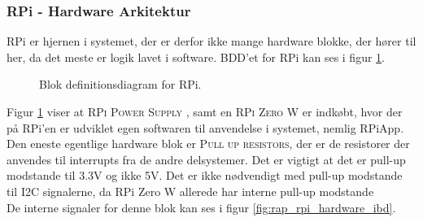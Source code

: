 \documentclass[Rapport/Rapport_main.tex]{subfiles}
\begin{document}
\subsubsection{RPi - Hardware Arkitektur}
RPi er hjernen i systemet, der er derfor ikke mange hardware blokke, der hører til her, da det meste er logik lavet i software. BDD'et for RPi kan ses i figur \ref{fig:rap_rpi_hardware_bdd}.
\begin{figure}[H]
    \centering
    \caption{Blok definitionsdiagram for RPi.}
    \label{fig:rap_rpi_hardware_bdd}
\end{figure}
Figur \ref{fig:rap_rpi_hardware_bdd} viser at \textsc{RPi Power Supply} , samt en \textsc{RPi Zero W} er indkøbt, hvor der på RPi'en er udviklet egen softwaren til anvendelse i systemet, nemlig RPiApp. Den eneste egentlige hardware blok er \textsc{Pull up resistors}, der er de resistorer der anvendes til interrupts fra de andre delsystemer. Det er vigtigt at det er pull-up modstande til 3.3V og ikke 5V. Det er ikke nødvendigt med pull-up modstande til I2C signalerne, da RPi Zero W allerede har interne pull-up modstande \autocite{RPiPins}  \\
De interne signaler for denne blok kan ses i figur \ref{fig:rap_rpi_hardware_ibd}.
\end{document}
